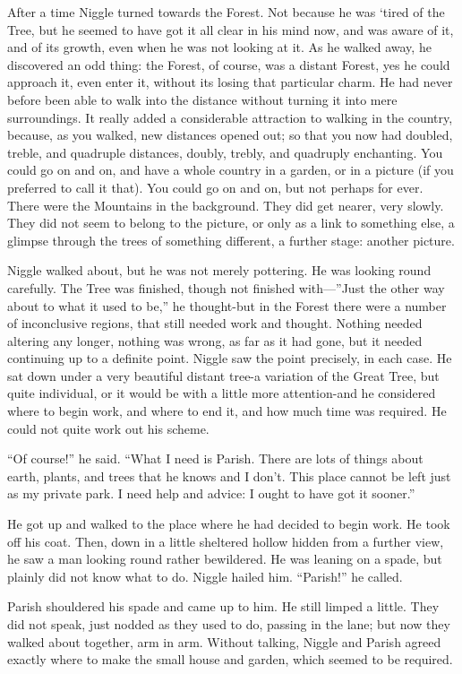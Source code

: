 \documentclass[english]{scrartcl}
\begin{document}
After a time Niggle turned towards the Forest. Not because he was ‘tired of the Tree, but he seemed to have got it all clear in his mind now, and was aware of it, and of its growth, even when he was not looking at it. As he walked away, he discovered an odd thing: the Forest, of course, was a distant Forest, yes he could approach it, even enter it, without its losing that particular charm. He had never before been able to walk into the distance without turning it into mere surroundings. It really added a considerable attraction to walking in the country, because, as you walked, new distances opened out; so that you now had doubled, treble, and quadruple distances, doubly, trebly, and quadruply enchanting. You could go on and on, and have a whole country in a garden, or in a picture (if you preferred to call it that). You could go on and on, but not perhaps for ever. There were the Mountains in the background. They did get nearer, very slowly. They did not seem to belong to the picture, or only as a link to something else, a glimpse through the trees of something different, a further stage: another picture.

Niggle walked about, but he was not merely pottering. He was looking round carefully. The Tree was finished, though not finished with—”Just the other way about to what it used to be,” he thought-but in the Forest there were a number of inconclusive regions, that still needed work and thought. Nothing needed altering any longer, nothing was wrong, as far as it had gone, but it needed continuing up to a definite point. Niggle saw the point precisely, in each case. He sat down under a very beautiful distant tree-a variation of the Great Tree, but quite individual, or it would be with a little more attention-and he considered where to begin work, and where to end it, and how much time was required. He could not quite work out his scheme.

“Of course!” he said. “What I need is Parish. There are lots of things about earth, plants, and trees that he knows and I don’t. This place cannot be left just as my private park. I need help and advice: I ought to have got it sooner.”

He got up and walked to the place where he had decided to begin work. He took off his coat. Then, down in a little sheltered hollow hidden from a further view, he saw a man looking round rather bewildered. He was leaning on a spade, but plainly did not know what to do. Niggle hailed him. “Parish!” he called.

Parish shouldered his spade and came up to him. He still limped a little. They did not speak, just nodded as they used to do, passing in the lane; but now they walked about together, arm in arm. Without talking, Niggle and Parish agreed exactly where to make the small house and garden, which seemed to be required.
\end{document}
